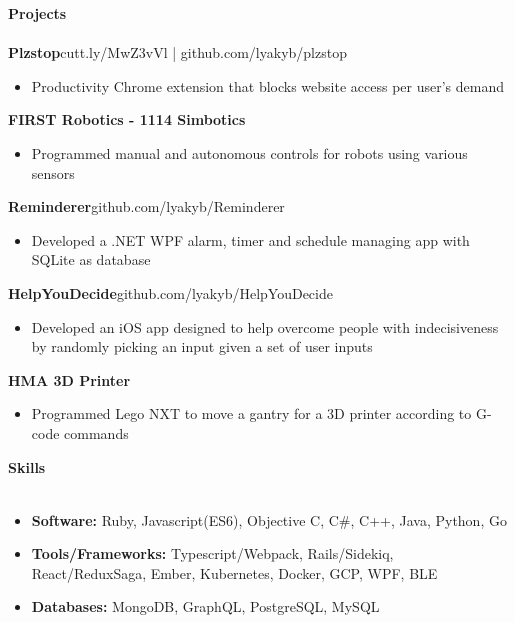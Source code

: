 \documentclass[a4paper]{article}
\newcommand{\lineunder} {
    \vspace{-8pt} \\
    \hspace{-18pt} \hrulefill \\
}
\newcommand{\header} [1] {
    {\hspace{-18pt}\vspace*{6pt} \textcolor{headerGray}{\textbf{\large{#1}}}}
    \vspace{-6pt} \lineunder
}
\begin{document}
\header{Projects}
{\textbf{\normalsize Plzstop}}\hfill \textcolor{dateGray}{cutt.ly/MwZ3vVl      |      github.com/lyakyb/plzstop}\\
\vspace{-2mm}
\begin{itemize}[leftmargin= 1cm]\itemsep -0.5pt
	\item Productivity Chrome extension that blocks website access per user's demand
\end{itemize}
\vspace{-1mm}
{\textbf{\normalsize FIRST Robotics - 1114 Simbotics}}\\
\vspace{-2mm}
\begin{itemize}[leftmargin=1cm ]\itemsep -0.5pt
	\item Programmed manual and autonomous controls for robots using various sensors
\end{itemize}
\vspace{-1mm}
{\textbf{\normalsize Reminderer}}\hfill \textcolor{dateGray}{github.com/lyakyb/Reminderer}\\
\vspace{-2mm}
\begin{itemize}[leftmargin=1cm ]\itemsep -0.5pt
	\item Developed a .NET WPF alarm, timer and schedule managing app with SQLite as database
\end{itemize}
\vspace{-1mm}
{\textbf{\normalsize HelpYouDecide}}\hfill \textcolor{dateGray}{github.com/lyakyb/HelpYouDecide}\\
\vspace{-2mm}
\begin{itemize}[leftmargin=1cm ]\itemsep -0.5pt
	\item Developed an iOS app designed to help overcome people with indecisiveness by randomly picking an input given a set of user inputs
\end{itemize}
{\textbf{\normalsize HMA 3D Printer}}\\
\vspace{-2.5mm}
\begin{itemize}[leftmargin=1cm ]\itemsep -0.5pt
	\item Programmed Lego NXT to move a gantry for a 3D printer according to G-code commands
\end{itemize}
\vspace{1mm}

\header{Skills}
\vspace{-2.5mm}
\begin{itemize}[leftmargin=*]\itemsep -0.5pt
	\item \textbf{Software: } Ruby, Javascript(ES6), Objective C, C\#, C++, Java, Python, Go\\
	\item \textbf{Tools/Frameworks: } Typescript/Webpack, Rails/Sidekiq, React/ReduxSaga, Ember, Kubernetes, Docker, GCP, WPF, BLE\\
	\item \textbf{Databases: } MongoDB, GraphQL, PostgreSQL, MySQL
\end{itemize}
\end{document}
